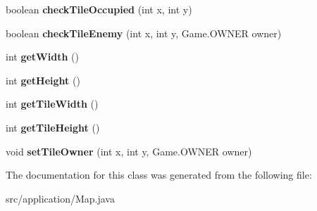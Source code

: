 \begin{DoxyCompactItemize}
\item 
\hypertarget{classapplication_1_1_map_a4c8ecfb3c342531fcf2e82b9951dacd9}{boolean {\bfseries check\+Tile\+Occupied} (int x, int y)}\label{classapplication_1_1_map_a4c8ecfb3c342531fcf2e82b9951dacd9}

\item 
\hypertarget{classapplication_1_1_map_ace2bcd71a180c9abcc48299dbded34f8}{boolean {\bfseries check\+Tile\+Enemy} (int x, int y, Game.\+O\+W\+N\+E\+R owner)}\label{classapplication_1_1_map_ace2bcd71a180c9abcc48299dbded34f8}

\item 
\hypertarget{classapplication_1_1_map_acf9ab16c56c49259ce5435e708db81d3}{int {\bfseries get\+Width} ()}\label{classapplication_1_1_map_acf9ab16c56c49259ce5435e708db81d3}

\item 
\hypertarget{classapplication_1_1_map_a937a0d16608ab0f866484f50cf3e2756}{int {\bfseries get\+Height} ()}\label{classapplication_1_1_map_a937a0d16608ab0f866484f50cf3e2756}

\item 
\hypertarget{classapplication_1_1_map_a1f0155540d45815c84b1f1fef5c02b78}{int {\bfseries get\+Tile\+Width} ()}\label{classapplication_1_1_map_a1f0155540d45815c84b1f1fef5c02b78}

\item 
\hypertarget{classapplication_1_1_map_aed96fe881a45be9f60937b28228e5690}{int {\bfseries get\+Tile\+Height} ()}\label{classapplication_1_1_map_aed96fe881a45be9f60937b28228e5690}

\item 
\hypertarget{classapplication_1_1_map_abc7ffbed0a366b2e703b1ea3757d0d6a}{void {\bfseries set\+Tile\+Owner} (int x, int y, Game.\+O\+W\+N\+E\+R owner)}\label{classapplication_1_1_map_abc7ffbed0a366b2e703b1ea3757d0d6a}

\end{DoxyCompactItemize}


The documentation for this class was generated from the following file\+:\begin{DoxyCompactItemize}
\item 
src/application/Map.\+java\end{DoxyCompactItemize}
